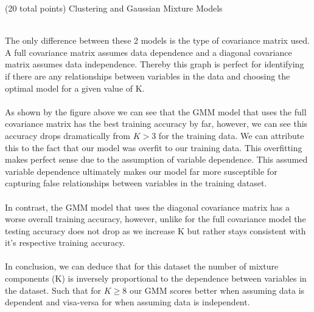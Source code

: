 \documentclass[12pt]{article}
\begin{document}
\begin{question}{(20 total points) Clustering and Gaussian Mixture Models}
\begin{subquestion}
\begin{answerbox}{52.8em}
{\\
        The only difference between these 2 models is the type of covariance matrix used. A full covariance matrix assumes data dependence and a diagonal covariance matrix assumes data independence. Thereby this graph is perfect for identifying if there are any relationships between variables in the data and choosing the optimal model for a given value of K.\\
\\ 
        As shown by the figure above we can see that the GMM model that uses the full covariance matrix has the best training accuracy by far, however, we can see this accuracy drops dramatically from $K > 3$ for the training data. We can attribute this to the fact that our model was overfit to our training data. This overfitting makes perfect sense due to the assumption of variable dependence. This assumed variable dependence ultimately makes our model far more susceptible for capturing false relationships between variables in the training dataset.\\
\\
        In contrast, the GMM model that uses the diagonal covariance matrix has a worse overall training accuracy, however, unlike for the full covariance model the testing accuracy does not drop as we increase K but rather stays consistent with it's respective training accuracy.
\\
\\
        In conclusion, we can deduce that for this dataset the number of mixture components (K) is inversely proportional to the dependence between variables in the dataset. Such that for $K \geq 8$ our GMM scores better when assuming data is dependent and visa-versa for when assuming data is independent.
        }
      \end{answerbox}
  


   \end{subquestion}

   
\end{question}
\end{document}
